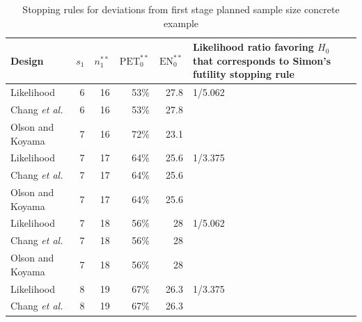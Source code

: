 \documentclass[12pt]{report}\usepackage[]{graphicx}\usepackage[]{color}
\newlength{\li}\setlength{\li}{14.48pt}
\begin{document}
\begin{table}[]
\centering
\caption{Stopping rules for deviations from first stage planned sample size concrete example}
\hspace*{-3.5cm}
\begin{tabular}{|L|R|R|R|R|L|}
\hline
Design           & $s_1$ & $n_1^{\ast\ast}$ & $\mbox{PET}_0^{\ast\ast}$ & $\mbox{EN}_0^{\ast\ast}$ & Likelihood ratio favoring $H_0$ that corresponds to Simon's futility stopping rule \\ \hline
Likelihood       & 6     & 16    & 53\%           & 27.8          & 1/5.062                                                                            \\ \hline
Chang \textit{et al.}           & 6     & 16    & 53\%           & 27.8          &                                                                                    \\ \hline
Olson and Koyama & 7     & 16    & 72\%           & 23.1          &                                                                                    \\ \hline
Likelihood       & 7     & 17    & 64\%           & 25.6          & 1/3.375                                                                            \\ \hline
Chang \textit{et al.}           & 7     & 17    & 64\%           & 25.6          &                                                                                    \\ \hline
Olson and Koyama & 7     & 17    & 64\%           & 25.6          &                                                                                    \\ \hline
Likelihood       & 7     & 18    & 56\%           & 28            & 1/5.062                                                                            \\ \hline
Chang \textit{et al.}           & 7     & 18    & 56\%           & 28            &                                                                                    \\ \hline
Olson and Koyama & 7     & 18    & 56\%           & 28            &                                                                                    \\ \hline
Likelihood       & 8     & 19    & 67\%           & 26.3          & 1/3.375                                                                            \\ \hline
Chang \textit{et al.}           & 8     & 19    & 67\%           & 26.3          &                                                                                    \\ \hline

\end{tabular}
\end{table}
\end{document}
